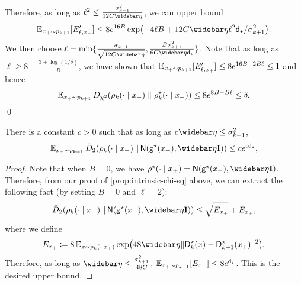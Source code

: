 Therefore, as long as $\ell^2\leq \frac{\sigma_{k+1}^2}{12C\etabar}$, we can upper bound 
\begin{align*}
    \En_{x_+\sim p_{k+1}}[E_{\ell, x_+}']
    \leq 8e^{16B}\exp\prn*{ -4\ell B + 12C\etabar \ell^2 \dbar/\sigma_{k+1}^2 }.
\end{align*}
We then choose $\ell=\min\crl{ \frac{\sigma_{k+1}}{\sqrt{12C\etabar}}, \frac{B\sigma_{k+1}^2}{6C \etabar \dbar} }$. Note that as long as $\ell\geq 8+\frac{3+\log(1/\delta)}{B}$, we have shown that $\operatorname{\mathbb{E}}_{x_+\sim p_{k+1}}[E_{\ell, x_+}']\leq 8e^{16B-2B \ell}\leq 1$ and hence
\begin{align*}
    \En_{x_+\sim p_{k+1}}\Dchis{\rho_k(\cdot\mid x_+)}{\rhostar_k(\cdot\mid x_+)}
    \leq 8e^{8B-B\ell}\leq \delta.
\end{align*}
\qed


\begin{corollary}\label{cor:DDPM-chi-sq}
There is a constant $c>0$ such that as long as $c\etabar\leq \sigma_{k+1}^2$,
\begin{align*}
    \En_{x_+\sim p_{k+1}}\Dsys[2]{\rho_k(\cdot\mid x_+)}{\normal{\gds(x_+),\etabar\Id}}\leq ce^{c\dstar},
\end{align*}
\end{corollary}

\begin{proof}
Note that when $B=0$, we have $\rhostar(\cdot\mid x_+)=\normal{\gds(x_+),\etabar\Id}$. Therefore, from our proof of \cref{prop:intrinsic-chi-sq} above, we can extract the following fact (by setting $B=0$ and $\ell=2$):
\begin{align*}
    \Dsys[2]{\rho_k(\cdot\mid x_+)}{\normal{\gds(x_+),\etabar\Id}}\leq \sqrt{E_{x_+}}+E_{x_+},
\end{align*}
where we define 
\begin{align*}
    E_{x_+}\deq 8\En_{x\sim \rho_k(\cdot\mid x_+)}\exp\prn*{ 48\etabar\nrm{\Ds_k(x)-\Ds_{k+1}(x_+)}^2}.
\end{align*}
Therefore, as long as $\etabar\leq \frac{\sigma_{k+1}^2}{48C}$, $\operatorname{\mathbb{E}}_{x_+\sim p_{k+1}}[E_{x_+}]\leq 8e^{\mathsf{d}_\star}$. This is the desired upper bound.
\end{proof}



\subsection{}

